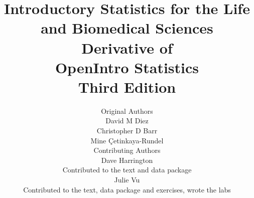 

\title{\huge Introductory Statistics for the Life and Biomedical Sciences \\[2mm]
\large Derivative of \\
OpenIntro Statistics \\
Third Edition}
\author{\Large Original Authors \\[1.5mm]
\normalsize David M Diez \\
\normalsize Christopher D Barr \\
\normalsize Mine \c{C}etinkaya-Rundel \\[8mm]
\Large Contributing Authors \\[1.5mm]
\normalsize Dave Harrington \\
\small Contributed to the text and data package \\[2mm]
\normalsize Julie Vu \\
\small Contributed to the text, data package and exercises, wrote the labs \\[2mm]
}

